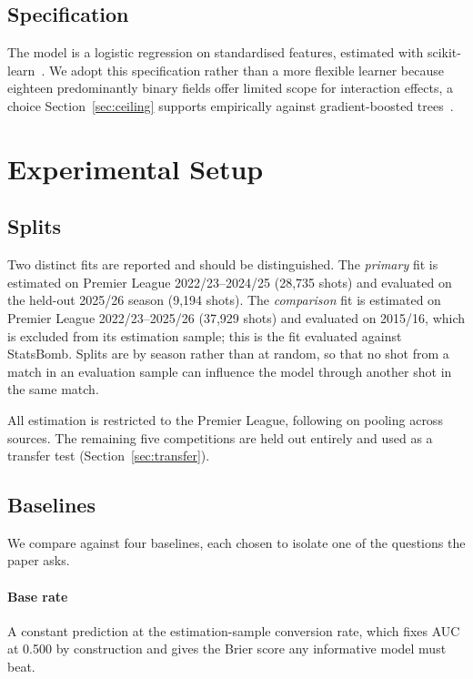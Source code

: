 \documentclass[conference]{IEEEtran}
\newcommand{\num}[1]{\mbox{#1}}
\begin{document}
\subsection{Specification}

The model is a logistic regression on standardised features, estimated with
scikit-learn~\cite{pedregosa2011sklearn}. We adopt this specification rather
than a more flexible learner because eighteen predominantly binary fields offer
limited scope for interaction effects, a choice Section~\ref{sec:ceiling}
supports empirically against gradient-boosted
trees~\cite{chen2016xgboost}.

\section{Experimental Setup}

\subsection{Splits}

Two distinct fits are reported and should be distinguished. The \emph{primary}
fit is estimated on Premier League 2022/23--2024/25 (\num{28,735} shots) and
evaluated on the held-out 2025/26 season (\num{9,194} shots). The
\emph{comparison} fit is estimated on Premier League 2022/23--2025/26
(\num{37,929} shots) and evaluated on 2015/16, which is excluded from its
estimation sample; this is the fit evaluated against StatsBomb. Splits are by
season rather than at random, so that no shot from a match in an evaluation
sample can influence the model through another shot in the same match.

All estimation is restricted to the Premier League, following
\cite{robberechts2020data} on pooling across sources. The remaining five
competitions are held out entirely and used as a transfer test
(Section~\ref{sec:transfer}).

\subsection{Baselines}
\label{sec:baselines}

We compare against four baselines, each chosen to isolate one of the questions
the paper asks.

\paragraph{Base rate} A constant prediction at the estimation-sample
conversion rate, which fixes AUC at \num{0.500} by construction and gives the
Brier score any informative model must beat.
\end{document}

